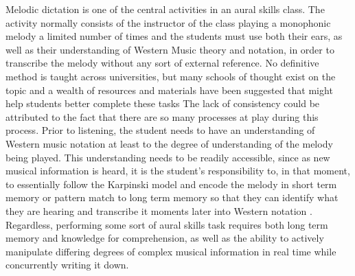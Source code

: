\documentclass[]{book}
\begin{document}
Melodic dictation is one of the central activities in an aural skills class.
The activity normally consists of the instructor of the class playing a monophonic melody a limited number of times and the students must use both their ears, as well as their understanding of Western Music theory and notation, in order to transcribe the melody without any sort of external reference.
No definitive method is taught across universities, but many schools of thought exist on the topic and a wealth of resources and materials have been suggested that might help students better complete these tasks \citep{berkowitzNewApproachSight2011, clelandDevelopingMusicianshipAural2010, karpinskiManualEarTraining2007, ottmanMusicSightSinging2014}
The lack of consistency could be attributed to the fact that there are so many processes at play during this process.
Prior to listening, the student needs to have an understanding of Western music notation at least to the degree of understanding of the melody being played.
This understanding needs to be readily accessible, since as new musical information is heard, it is the student's responsibility to, in that moment, to essentially follow the Karpinski model and encode the melody in short term memory or pattern match to long term memory \citep{ouraConstructingRepresentationMelody1991a} so that they can identify what they are hearing and transcribe it moments later into Western notation \citep{karpinskiAuralSkillsAcquisition2000, karpinskiModelMusicPerception1990}.
Regardless, performing some sort of aural skills task requires both long term memory and knowledge for comprehension, as well as the ability to actively manipulate differing degrees of complex musical information in real time while concurrently writing it down.
\end{document}
